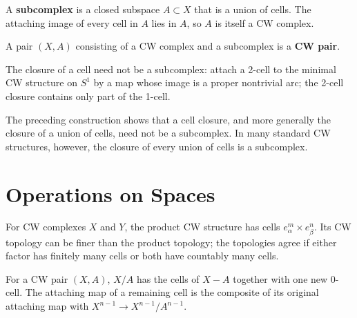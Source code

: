 \begin{definition}[Subcomplex]
\label{def:subcomplex}


A \textbf{subcomplex} is a closed subspace $A\subset X$ that is a union of cells.
The attaching image of every cell in $A$ lies in $A$, so $A$ is itself a CW complex.
\end{definition}

\begin{definition}[CW pair]
\label{def:cw-pair}


A pair $(X,A)$ consisting of a CW complex and a subcomplex is a \textbf{CW pair}.
\end{definition}

The closure of a cell need not be a subcomplex: attach a 2-cell to the minimal CW
structure on $S^1$ by a map whose image is a proper nontrivial arc; the 2-cell closure
contains only part of the 1-cell.

\begin{remark}
\label{rem:closure-of-cell-not-always-subcomplex}

The preceding construction shows that a cell closure, and more generally the closure
of a union of cells, need not be a subcomplex. In many standard CW structures,
however, the closure of every union of cells is a subcomplex.
\end{remark}

\section{Operations on Spaces}
\label{sec:operations-on-spaces}

\begin{definition}
\label{def:product-cw-structure}


For CW complexes $X$ and $Y$, the product CW structure has cells
$e^m_\alpha\times e^n_\beta$. Its CW topology can be finer than the product topology;
the topologies agree if either factor has finitely many cells or both have countably
many cells.
\end{definition}

\begin{definition}
\label{def:quotient-cw-structure}



For a CW pair $(X,A)$, $X/A$ has the cells of $X-A$ together with one new 0-cell.
The attaching map of a remaining cell is the composite of its original attaching map
with $X^{n-1}\to X^{n-1}/A^{n-1}$.
\end{definition}

